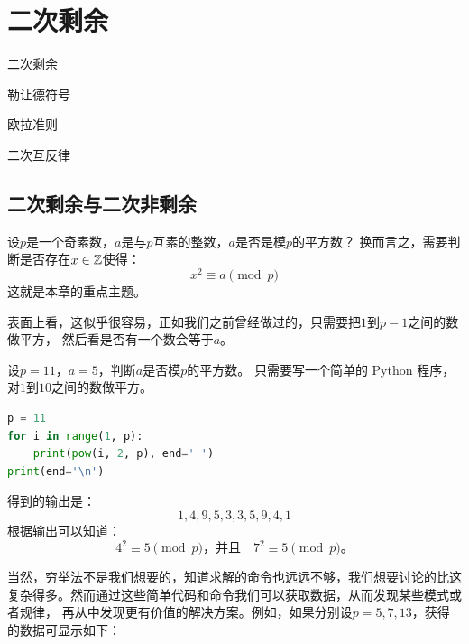 
\chapter{二次剩余}
\label{chap:qr} 

\begin{introduction}
  \item 二次剩余
  \item 勒让德符号
  \item  欧拉准则
  \item 二次互反律
\end{introduction}

\section{二次剩余与二次非剩余}
\label{sec:qr_qnr}
设$p$是一个奇素数，$a$是与$p$互素的整数，$a$是否是模$p$的平方数？
换而言之，需要判断是否存在$x\in {\mathbb Z}$使得：
\[ x^2 \equiv a \pmod{p}\]
这就是本章的重点主题。

表面上看，这似乎很容易，正如我们之前曾经做过的，只需要把$1$到$p-1$之间的数做平方， 然后看是否有一个数会等于$a$。

\begin{example}
设$p = 11$，$a = 5$，判断$a$是否模$p$的平方数。
只需要写一个简单的 Python 程序，对$1$到$10$之间的数做平方。
\begin{lstlisting}[language=Python]
p = 11
for i in range(1, p):
    print(pow(i, 2, p), end=' ')
print(end='\n')
\end{lstlisting}
得到的输出是：
\[1, 4, 9, 5, 3, 3, 5, 9, 4, 1\]
根据输出可以知道：
\[ 4^2 \equiv 5 \pmod{p}\text{，并且}\quad 7^2 \equiv 5 \pmod{p}\text{。}\] 
 \end{example}
  
当然，穷举法不是我们想要的，知道求解的命令也远远不够，我们想要讨论的比这复杂得多。然而通过这些简单代码和命令我们可以获取数据，从而发现某些模式或者规律，
再从中发现更有价值的解决方案。例如，如果分别设$p = 5, 7, 13$，获得的数据可显示如下：

